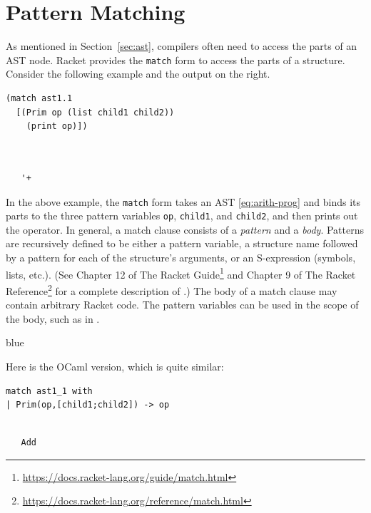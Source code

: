 \documentclass[11pt]{book}
\newenvironment{ocamlx}{
  \begin{color}{blue}
}
{
  \end{color}
}
\begin{document}
\section{Pattern Matching}
\label{sec:pattern-matching}

As mentioned in Section~\ref{sec:ast}, compilers often need to access
the parts of an AST node. Racket provides the \texttt{match} form to
access the parts of a structure. Consider the following example and
the output on the right.  
\begin{center}
\begin{minipage}{0.5\textwidth}
\begin{lstlisting}
(match ast1.1
  [(Prim op (list child1 child2))
    (print op)])
\end{lstlisting}
\end{minipage}
\vrule
\begin{minipage}{0.25\textwidth}
\begin{lstlisting}


   '+
\end{lstlisting}
\end{minipage}
\end{center}
In the above example, the \texttt{match} form takes an AST
\eqref{eq:arith-prog} and binds its parts to the three pattern
variables \texttt{op}, \texttt{child1}, and \texttt{child2}, and then
prints out the operator. In general, a match clause consists of a
\emph{pattern} and a \emph{body}. Patterns are
recursively defined to be either a pattern variable, a structure name
followed by a pattern for each of the structure's arguments, or an
S-expression (symbols, lists, etc.).  (See Chapter 12 of The Racket
Guide\footnote{\url{https://docs.racket-lang.org/guide/match.html}}
and Chapter 9 of The Racket
Reference\footnote{\url{https://docs.racket-lang.org/reference/match.html}}
for a complete description of .)
%
The body of a match clause may contain arbitrary Racket code.  The
pattern variables can be used in the scope of the body, such as
 in .

\begin{ocamlx}
  Here is the OCaml version, which is quite similar:
\begin{center}
\begin{minipage}{0.5\textwidth}
\begin{lstlisting}[style=ocaml]
match ast1_1 with
| Prim(op,[child1;child2]) -> op
\end{lstlisting}
\end{minipage}
\vrule
\begin{minipage}{0.25\textwidth}
\begin{lstlisting}[style=ocaml]

   Add
\end{lstlisting}
\end{minipage}
\end{center}
\end{ocamlx}
\end{document}

